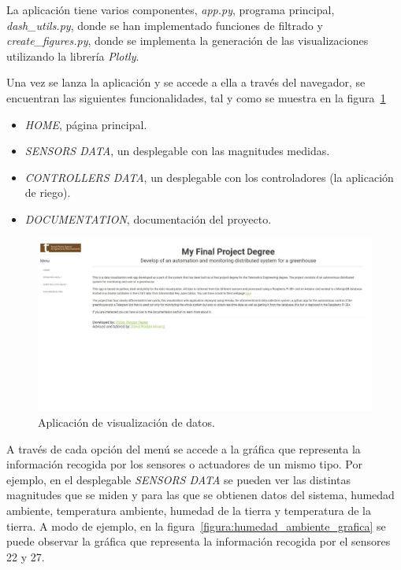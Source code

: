 \documentclass[a4paper, 12pt, oneside]{book}
\begin{document}
La aplicación tiene varios componentes, \textit{app.py}, programa principal, \textit{dash\_utils.py},  donde se han implementado funciones de filtrado y \textit{create\_figures.py}, donde se implementa la generación de las visualizaciones utilizando la librería \textit{Plotly}.

Una vez se lanza la aplicación y se accede a ella a través del navegador, se encuentran las siguientes funcionalidades, tal y como se muestra en la figura~\ref{figura:web}

\begin{itemize}
\item \textit{HOME}, página principal.
\item \textit{SENSORS DATA}, un desplegable con las magnitudes medidas.
\item \textit{CONTROLLERS DATA}, un desplegable con los controladores (la aplicación de riego).
\item \textit{DOCUMENTATION}, documentación del proyecto.
\end{itemize}

\begin{figure}[H]
	\centering
    \includegraphics[width=12cm, keepaspectratio]{img/web}
    \caption{Aplicación de visualización de datos.}
    \label{figura:web}
\end{figure}

A través de cada opción del menú se accede a la gráfica que representa la información recogida por los sensores o actuadores de un mismo tipo. Por ejemplo, en el desplegable \textit{SENSORS DATA} se pueden ver las distintas magnitudes que se miden y para las que se obtienen datos del sistema, humedad ambiente, temperatura ambiente, humedad de la tierra y temperatura de la tierra. A modo de ejemplo, en la figura~\ref{figura:humedad_ambiente_grafica} se puede observar la gráfica que representa la información recogida por el sensores 22 y 27.
\end{document}
